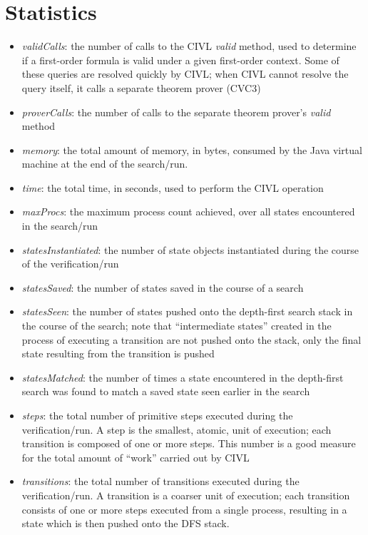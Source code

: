 \section{Statistics}

\begin{itemize}
\item \emph{validCalls}: the number of calls to the CIVL \emph{valid}
  method, used to determine if a first-order formula is valid under
  a given first-order context.   Some of these queries are resolved
  quickly by CIVL; when CIVL cannot resolve the query itself, it
  calls a separate theorem prover (CVC3)
\item \emph{proverCalls}: the number of calls to the separate theorem
  prover's \emph{valid} method
\item \emph{memory}: the total amount of memory, in bytes, consumed by
  the Java virtual machine at the end of the search/run.
\item \emph{time}: the total time, in seconds, used to perform the
  CIVL operation
\item \emph{maxProcs}: the maximum process count achieved, over all states 
  encountered in the search/run
\item \emph{statesInstantiated}: the number of state objects
  instantiated during the course of the verification/run
\item \emph{statesSaved}: the number of states saved in the course
  of a search
\item \emph{statesSeen}: the number of states pushed onto the 
  depth-first search stack in the course of the search; note
  that ``intermediate states'' created in the process of executing
  a transition are not pushed onto the stack, only the final
  state resulting from the transition is pushed
\item \emph{statesMatched}: the number of times a state encountered
  in the depth-first search was found to match a saved state seen
  earlier in the search
\item \emph{steps}: the total number of primitive steps executed
  during the verification/run.  A step is the smallest, atomic,
  unit of execution; each transition is composed of one or more steps.
  This number is a good measure for the total amount of ``work''
  carried out by CIVL
\item \emph{transitions}: the total number of transitions executed
  during the verification/run.  A transition is a coarser unit
  of execution; each transition consists of one or more steps 
  executed from a single process, resulting in a state which is then
  pushed onto the DFS stack.
\end{itemize}
 